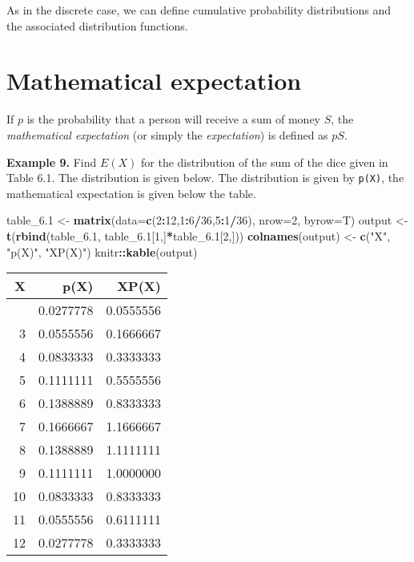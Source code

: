 \documentclass[
]{article}
\newenvironment{Shaded}{\begin{snugshade}}{\end{snugshade}}
\newcommand{\AttributeTok}[1]{\textcolor[rgb]{0.13,0.29,0.53}{#1}}
\newcommand{\DecValTok}[1]{\textcolor[rgb]{0.00,0.00,0.81}{#1}}
\newcommand{\FloatTok}[1]{\textcolor[rgb]{0.00,0.00,0.81}{#1}}
\newcommand{\FunctionTok}[1]{\textcolor[rgb]{0.13,0.29,0.53}{\textbf{#1}}}
\newcommand{\NormalTok}[1]{#1}
\newcommand{\OtherTok}[1]{\textcolor[rgb]{0.56,0.35,0.01}{#1}}
\newcommand{\SpecialCharTok}[1]{\textcolor[rgb]{0.81,0.36,0.00}{\textbf{#1}}}
\newcommand{\StringTok}[1]{\textcolor[rgb]{0.31,0.60,0.02}{#1}}
\begin{document}
As in the discrete case, we can define cumulative probability
distributions and the associated distribution functions.

\hypertarget{mathematical-expectation}{%
\section{Mathematical expectation}\label{mathematical-expectation}}

If \(p\) is the probability that a person will receive a sum of money
\(S\), the \emph{mathematical expectation} (or simply the
\emph{expectation}) is defined as \(pS\).

\textbf{Example 9.} Find \(E(X)\) for the distribution of the sum of the
dice given in Table 6.1. The distribution is given below. The
distribution is given by \texttt{p(X)}, the mathematical expectation is
given below the table.

\begin{Shaded}
\begin{Highlighting}[]
\NormalTok{table\_6}\FloatTok{.1} \OtherTok{\textless{}{-}} \FunctionTok{matrix}\NormalTok{(}\AttributeTok{data=}\FunctionTok{c}\NormalTok{(}\DecValTok{2}\SpecialCharTok{:}\DecValTok{12}\NormalTok{,}\DecValTok{1}\SpecialCharTok{:}\DecValTok{6}\SpecialCharTok{/}\DecValTok{36}\NormalTok{,}\DecValTok{5}\SpecialCharTok{:}\DecValTok{1}\SpecialCharTok{/}\DecValTok{36}\NormalTok{), }\AttributeTok{nrow=}\DecValTok{2}\NormalTok{, }\AttributeTok{byrow=}\NormalTok{T)}
\NormalTok{output }\OtherTok{\textless{}{-}} \FunctionTok{t}\NormalTok{(}\FunctionTok{rbind}\NormalTok{(table\_6}\FloatTok{.1}\NormalTok{, table\_6}\FloatTok{.1}\NormalTok{[}\DecValTok{1}\NormalTok{,]}\SpecialCharTok{*}\NormalTok{table\_6}\FloatTok{.1}\NormalTok{[}\DecValTok{2}\NormalTok{,]))}
\FunctionTok{colnames}\NormalTok{(output) }\OtherTok{\textless{}{-}} \FunctionTok{c}\NormalTok{(}\StringTok{"X"}\NormalTok{, }\StringTok{"p(X)"}\NormalTok{, }\StringTok{"XP(X)"}\NormalTok{)}
\NormalTok{knitr}\SpecialCharTok{::}\FunctionTok{kable}\NormalTok{(output)}
\end{Highlighting}
\end{Shaded}

\begin{longtable}[]{@{}rrr@{}}
\toprule\noalign{}
X & p(X) & XP(X) \\
\midrule\noalign{}
\endhead
\bottomrule\noalign{}
\endlastfoot
2 & 0.0277778 & 0.0555556 \\
3 & 0.0555556 & 0.1666667 \\
4 & 0.0833333 & 0.3333333 \\
5 & 0.1111111 & 0.5555556 \\
6 & 0.1388889 & 0.8333333 \\
7 & 0.1666667 & 1.1666667 \\
8 & 0.1388889 & 1.1111111 \\
9 & 0.1111111 & 1.0000000 \\
10 & 0.0833333 & 0.8333333 \\
11 & 0.0555556 & 0.6111111 \\
12 & 0.0277778 & 0.3333333 \\
\end{longtable}
\end{document}
